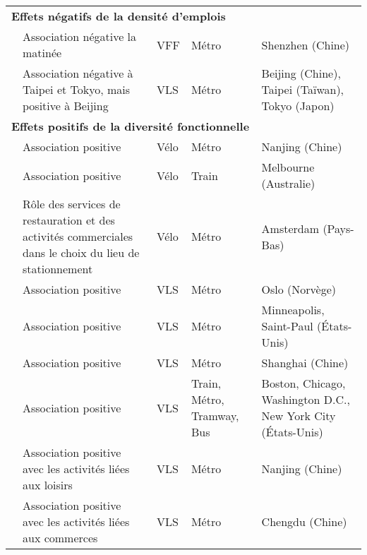 \begin{longtable}{p{3cm}p{4cm}p{1.5cm}p{1.8cm}p{2.3cm}}
    \hline
\multicolumn{5}{l}{\textbf{Effets négatifs de la densité d'emplois}}\\
    \small{\textcite{guo_built_2020, guo_role_2021}} & \small{Association négative la matinée} & \small{VFF} & \small{Métro} & \small{Shenzhen (Chine)}\\
    \small{\textcite{lin_built_2018}}\index{Lin, Jen-Jia|pagebf} & \small{Association négative à Taipei et Tokyo, mais positive à Beijing} & \small{VLS} & \small{Métro} & \small{Beijing (Chine), Taipei (Taïwan), Tokyo (Japon)}\\
    \hline
\multicolumn{5}{l}{\textbf{Effets positifs de la diversité fonctionnelle}}\\
    \small{\textcite{gan_associations_2021}}\index{Gan, Zuoxian|pagebf} & \small{Association positive} & \small{Vélo} & \small{Métro} & \small{Nanjing (Chine)}\\
    \small{\textcite{weliwitiya_bicycle_2019}}\index{Weliwitiya, Hesara|pagebf} & \small{Association positive} & \small{Vélo} & \small{Train} & \small{Melbourne (Australie)}\\
    \small{\textcite{kampen_bicycle_2021}}\index{van Kampen, Jullian|pagebf} & \small{Rôle des services de restauration et des activités commerciales dans le choix du lieu de stationnement} & \small{Vélo} & \small{Métro} & \small{Amsterdam (Pays-Bas)}\\
    \small{\textcite{bocker_bike_2020}}\index{Böcker, Lars|pagebf} & \small{Association positive} & \small{VLS} & \small{Métro} & \small{Oslo (Norvège)}\\
    \small{\textcite{song_investigating_2020}}\index{Song, Ying|pagebf} & \small{Association positive} & \small{VLS} & \small{Métro} & \small{Minneapolis, Saint-Paul (États-Unis)}\\
    \small{\textcite{yu_policy_2021}}\index{Yu, Qing|pagebf} & \small{Association positive} & \small{VLS} & \small{Métro} & \small{Shanghai (Chine)}\\
    \small{\textcite{kong_deciphering_2020}}\index{Kong, Hui|pagebf} & \small{Association positive} & \small{VLS} & \small{Train, Métro, Tramway, Bus} & \small{Boston, Chicago, Washington D.C., New York City (États-Unis)}\\
    \small{\textcite{ji_exploring_2018}}\index{Ji, Yanjie|pagebf} & \small{Association positive avec les activités liées aux loisirs} & \small{VLS} & \small{Métro} & \small{Nanjing (Chine)}\\
    \small{\textcite{bi_analysis_2021}}\index{Bi, Hui|pagebf} & \small{Association positive avec les activités liées aux commerces} & \small{VLS} & \small{Métro} & \small{Chengdu (Chine)}\\

\end{longtable}
